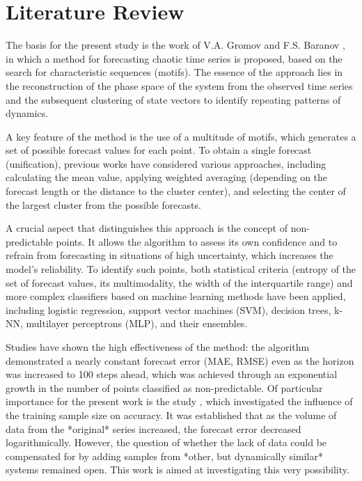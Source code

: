 \documentclass[a4paper,12pt]{extarticle}
\begin{document}
\section{Literature Review}

The basis for the present study is the work of V.A. Gromov and F.S. Baranov \cite{GromovBaranov2023},
in which a method for forecasting chaotic time series is proposed,
 based on the search for characteristic sequences (motifs).
  The essence of the approach lies in the reconstruction of the phase space of the
   system from the observed time series and the subsequent clustering of
   state vectors to identify repeating patterns of dynamics.

A key feature of the method is the use of a multitude of motifs,
which generates a set of possible forecast values for each point.
 To obtain a single forecast (unification), previous works
  have considered various approaches, including calculating the mean
   value, applying weighted averaging (depending on the forecast length or the distance
    to the cluster center), and selecting the center of the largest cluster from the possible forecasts.

A crucial aspect that distinguishes this approach is the concept of
non-predictable points. It allows the algorithm to assess its own confidence
 and to refrain from forecasting in situations of high uncertainty,
 which increases the model's reliability. To identify such points, both
 statistical criteria (entropy of the set of forecast values, its
 multimodality, the width of the interquartile range) and more complex
 classifiers based on machine learning methods have been applied, including logistic regression,
  support vector machines (SVM), decision trees, k-NN, multilayer perceptrons (MLP), and their ensembles.\cite{Wang2019}

Studies have shown the high effectiveness of the method: the algorithm demonstrated
a nearly constant forecast error (MAE, RMSE) even as the
horizon was increased to 100 steps ahead, which was achieved through an exponential
 growth in the number of points classified as non-predictable. Of particular importance
  for the present work is the study \cite{Gromov2021}, which investigated the influence
  of the training sample size on accuracy. It was established that as the volume of
  data from the *original* series increased, the forecast error decreased logarithmically. However,
  the question of whether the lack of data could be compensated for by adding
  samples from *other, but dynamically similar* systems remained open.
 This work is aimed at investigating this very possibility.
\end{document}
